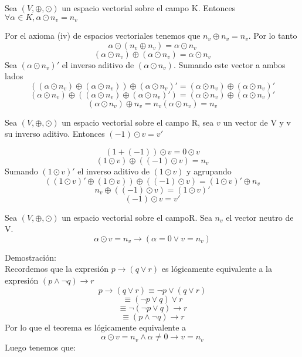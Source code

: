 \begin{theorem}
Sea $(V,\oplus ,\odot )$ un espacio vectorial sobre el campo K. Entonces $\forall \alpha \in K,\alpha \odot n_v=n_v$
\end{theorem}

Por el axioma (iv) de espacios vectoriales tenemos que $n_v\oplus n_v=n_v$. Por lo tanto
$$\alpha \odot (n_v\oplus n_v )=\alpha \odot n_v$$
            $$(\alpha \odot n_v )\oplus (\alpha \odot n_v )=\alpha \odot n_v$$
Sea $ (\alpha \odot n_v )'$ el inverso aditivo de $(\alpha \odot n_v )$. Sumando este vector a ambos lados
               $$ ((\alpha \odot n_v )\oplus (\alpha \odot n_v ))\oplus (\alpha \odot n_v )'=(\alpha \odot n_v)\oplus (\alpha \odot n_v )'$$
               $$ (\alpha \odot n_v )\oplus ((\alpha \odot n_v )\oplus (\alpha \odot n_v )' )=(\alpha \odot n_v)\oplus (\alpha \odot n_v )'$$
                                            $$  (\alpha \odot n_v )\oplus n_v=n_v
      (\alpha \odot n_v )=n_v$$

\newpage


\begin{theorem}
Sea $(V,\oplus ,\odot )$ un espacio vectorial sobre el campo R,  sea $v$ un vector de V y v su inverso aditivo. 
Entonces $(-1)\odot v=v'$

\end{theorem}
$$(1+(-1))\odot v=0\odot v$$
                                    $$(1\odot v)\oplus ((-1)\odot v)=n_v$$
Sumando $(1\odot v)'$ el inverso aditivo de $(1\odot v)$ y agrupando
                 $$ ((1\odot v)'\oplus (1\odot v))\oplus ((-1)\odot v)  =(1\odot v)'\oplus n_v$$
   $$ n_v\oplus ((-1)\odot v)=(1\odot v)'$$
      $$  (-1)\odot v=v'$$

\begin{theorem}

Sea $(V,\oplus ,\odot )$ un espacio vectorial sobre el campoR. Sea $n_v$ el vector neutro de V.
$$\alpha \odot v=n_v   \rightarrow  (  \alpha =0   \vee    v=n_v   )$$
\end{theorem}
Demostración:~\\

Recordemos que la expresión $ p\rightarrow (q\vee r)$ es lógicamente equivalente a la expresión $(p\wedge \neg q)\rightarrow r$
$$p\rightarrow(q\vee r)\equiv  \neg p\vee (q\vee r)$$
               $$ \equiv  (\neg p\vee q)\vee r$$
              $$     \equiv  \neg (\neg p\vee q)\rightarrow r$$
               $$  \equiv  (p\wedge \neg q)\rightarrow r$$
Por lo que el teorema es lógicamente equivalente a 
$$\alpha \odot v=n_v  \wedge  \alpha \neq 0  \rightarrow   v=n_v $$  
Luego tenemos que:

